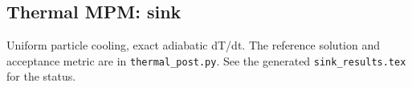 \subsection{Thermal MPM: sink}
Uniform particle cooling, exact adiabatic dT/dt. The reference solution and acceptance metric are in \texttt{thermal\_post.py}. See the generated \texttt{sink\_results.tex} for the status.

